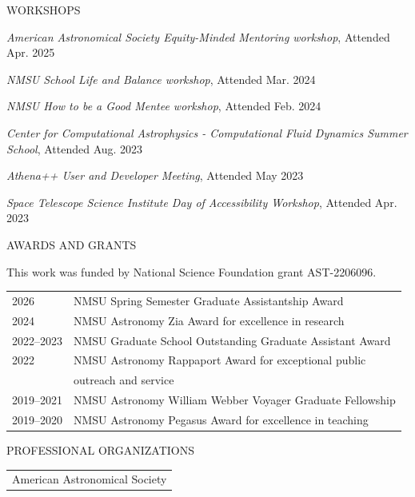 \begin{center}
WORKSHOPS
\end{center}

\hangindent=0.5in \noindent \textit{American Astronomical Society Equity-Minded Mentoring workshop}, Attended Apr. 2025

\hangindent=0.5in \noindent \textit{NMSU School Life and Balance workshop}, Attended Mar. 2024

\hangindent=0.5in \noindent \textit{NMSU How to be a Good Mentee workshop}, Attended Feb. 2024

\hangindent=0.5in \noindent \textit{Center for Computational Astrophysics - Computational Fluid Dynamics Summer School}, Attended Aug. 2023

\hangindent=0.5in \noindent \textit{Athena++ User and Developer Meeting}, Attended May 2023

\hangindent=0.5in \noindent \textit{Space Telescope Science Institute Day of Accessibility Workshop}, Attended Apr. 2023



\begin{center}
AWARDS AND GRANTS
\end{center}

\noindent This work was funded by National Science Foundation grant AST-2206096. 

\begin{flushleft}
\begin{tabular}{ll}
2026 & NMSU Spring Semester Graduate Assistantship Award \\
2024 & NMSU Astronomy Zia Award for excellence in research \\
2022--2023 & NMSU Graduate School Outstanding Graduate Assistant Award \\
2022 & NMSU Astronomy Rappaport Award for exceptional public \\
     & outreach and service \\ 
2019--2021 & NMSU Astronomy William Webber Voyager Graduate Fellowship \\
2019--2020 & NMSU Astronomy Pegasus Award for excellence in teaching \\
\end{tabular}
\end{flushleft}

\medskip

\doublespacing
\begin{center}
PROFESSIONAL ORGANIZATIONS
\end{center}
\begin{flushleft}
\begin{tabular}{l}
American Astronomical Society \\
\end{tabular}
\end{flushleft}

